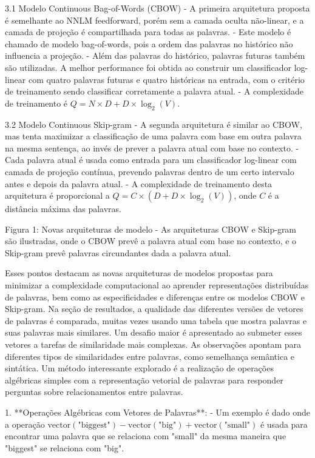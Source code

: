 3.1 Modelo Continuous Bag-of-Words (CBOW)
- A primeira arquitetura proposta é semelhante ao NNLM feedforward, porém sem a camada oculta não-linear, e a camada de projeção é compartilhada para todas as palavras.
- Este modelo é chamado de modelo bag-of-words, pois a ordem das palavras no histórico não influencia a projeção.
- Além das palavras do histórico, palavras futuras também são utilizadas. A melhor performance foi obtida ao construir um classificador log-linear com quatro palavras futuras e quatro históricas na entrada, com o critério de treinamento sendo classificar corretamente a palavra atual.
- A complexidade de treinamento é \(Q = N \times D + D \times \log_2(V)\).

3.2 Modelo Continuous Skip-gram
- A segunda arquitetura é similar ao CBOW, mas tenta maximizar a classificação de uma palavra com base em outra palavra na mesma sentença, ao invés de prever a palavra atual com base no contexto.
- Cada palavra atual é usada como entrada para um classificador log-linear com camada de projeção contínua, prevendo palavras dentro de um certo intervalo antes e depois da palavra atual.
- A complexidade de treinamento desta arquitetura é proporcional a \(Q = C \times (D + D \times \log_2(V))\), onde \(C\) é a distância máxima das palavras.

Figura 1: Novas arquiteturas de modelo
- As arquiteturas CBOW e Skip-gram são ilustradas, onde o CBOW prevê a palavra atual com base no contexto, e o Skip-gram prevê palavras circundantes dada a palavra atual.

Esses pontos destacam as novas arquiteturas de modelos propostas para minimizar a complexidade computacional ao aprender representações distribuídas de palavras, bem como as especificidades e diferenças entre os modelos CBOW e Skip-gram. 
Na seção de resultados, a qualidade das diferentes versões de vetores de palavras é comparada, muitas vezes usando uma tabela que mostra palavras e suas palavras mais similares. Um desafio maior é apresentado ao submeter esses vetores a tarefas de similaridade mais complexas. As observações apontam para diferentes tipos de similaridades entre palavras, como semelhança semântica e sintática. Um método interessante explorado é a realização de operações algébricas simples com a representação vetorial de palavras para responder perguntas sobre relacionamentos entre palavras.

1. **Operações Algébricas com Vetores de Palavras**:
   - Um exemplo é dado onde a operação \( \text{vector}(\text{"biggest"}) - \text{vector}(\text{"big"}) + \text{vector}(\text{"small"}) \) é usada para encontrar uma palavra que se relaciona com "small" da mesma maneira que "biggest" se relaciona com "big".

